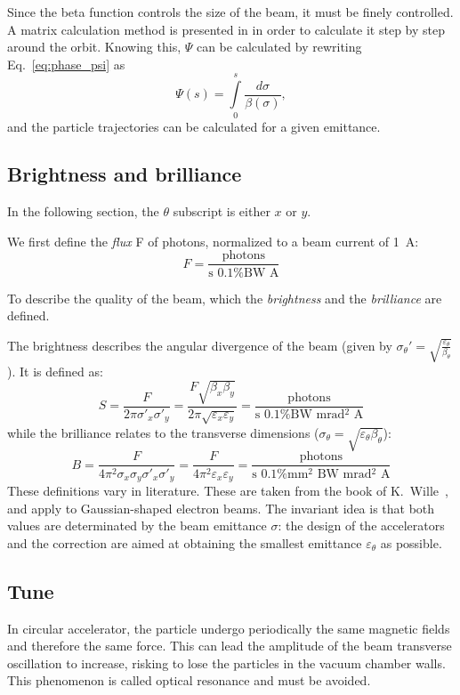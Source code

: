 \remark Since the beta function controls the size of the beam, it must be finely controlled. A matrix calculation method is presented in \cite{book:wille} in order to calculate it step by step around the orbit. Knowing this, $\Psi$ can be calculated by rewriting Eq.~\eqref{eq:phase_psi} as 
\begin{equation}
\Psi(s)=\int \limits_{0}^{s} \frac{d\sigma}{\beta(\sigma)},
\end{equation}
and the particle trajectories can be calculated for a given emittance.

\subsection{Brightness and brilliance}
\label{sec:brightness_brillance}
In the following section, the $\theta$ subscript is either $x$ or $y$.

We first define the \emph{flux} F of photons, normalized to a beam current of 1~A:
\begin{equation}
F = \frac{\text{photons}}{\text{s 0.1\% BW A}}
\end{equation}

To describe the quality of the beam, which the \emph{brightness} and the \emph{brilliance} are defined.

The brightness describes the angular divergence of the beam (given by $\sigma_\theta'=\sqrt{\frac{\varepsilon_\theta}{\beta_\theta}}$). It is defined as:
\begin{equation}
S = \frac{F}{2 \pi \sigma'_x \sigma'_y} = \frac{F \sqrt{\beta_x \beta_y}}{2 \pi \sqrt{\varepsilon_x \varepsilon_y}} = \frac{\text{photons}}{\text{s 0.1\% BW mrad$^2$ A}}
\end{equation}
while the brilliance relates to the transverse dimensions ($\sigma_\theta=\sqrt{\varepsilon_\theta \beta_\theta}$):
\begin{equation}
B = \frac{F}{4 \pi^2 \sigma_x \sigma_y \sigma'_x \sigma'_y} = \frac{F}{4 \pi^2 \varepsilon_x \varepsilon_y} = \frac{\text{photons}}{\text{s 0.1\% mm$^2$ BW mrad$^2$ A}}
\end{equation}
These definitions vary in literature. These are taken from the book of K.~Wille~\cite{book:wille}, and apply to Gaussian-shaped electron beams. The invariant idea is that both values are determinated by the beam emittance $\sigma$: the design of the accelerators and the correction are aimed at obtaining the smallest emittance $\varepsilon_\theta$ as possible.

\subsection{Tune}
In circular accelerator, the particle undergo periodically the same magnetic fields and therefore the same force. This can lead the amplitude of the beam transverse oscillation to increase, risking to lose the particles in the vacuum chamber walls. This phenomenon is called optical resonance and must be avoided.

